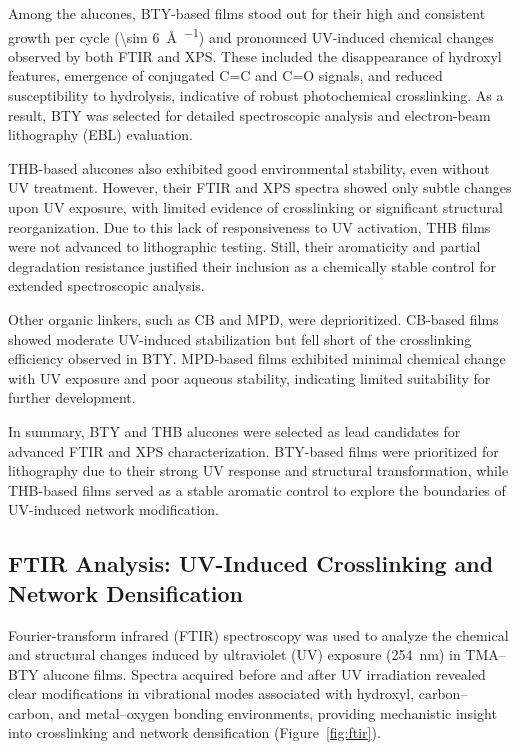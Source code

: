 Among the alucones, BTY-based films stood out for their high and consistent growth per cycle (\SI{\sim 6}{\angstrom\per\cycle}) and pronounced UV-induced chemical changes observed by both FTIR and XPS. These included the disappearance of hydroxyl features, emergence of conjugated C=C and C=O signals, and reduced susceptibility to hydrolysis, indicative of robust photochemical crosslinking. As a result, BTY was selected for detailed spectroscopic analysis and electron-beam lithography (EBL) evaluation.

THB-based alucones also exhibited good environmental stability, even without UV treatment. However, their FTIR and XPS spectra showed only subtle changes upon UV exposure, with limited evidence of crosslinking or significant structural reorganization. Due to this lack of responsiveness to UV activation, THB films were not advanced to lithographic testing. Still, their aromaticity and partial degradation resistance justified their inclusion as a chemically stable control for extended spectroscopic analysis.

Other organic linkers, such as CB and MPD, were deprioritized. CB-based films showed moderate UV-induced stabilization but fell short of the crosslinking efficiency observed in BTY. MPD-based films exhibited minimal chemical change with UV exposure and poor aqueous stability, indicating limited suitability for further development.

In summary, BTY and THB alucones were selected as lead candidates for advanced FTIR and XPS characterization. BTY-based films were prioritized for lithography due to their strong UV response and structural transformation, while THB-based films served as a stable aromatic control to explore the boundaries of UV-induced network modification.

\subsection{FTIR Analysis: UV-Induced Crosslinking and Network Densification}

Fourier-transform infrared (FTIR) spectroscopy was used to analyze the chemical and structural changes induced by ultraviolet (UV) exposure (\SI{254}{\nano\meter}) in TMA–BTY alucone films. Spectra acquired before and after UV irradiation revealed clear modifications in vibrational modes associated with hydroxyl, carbon–carbon, and metal–oxygen bonding environments, providing mechanistic insight into crosslinking and network densification (Figure~\ref{fig:ftir}).

